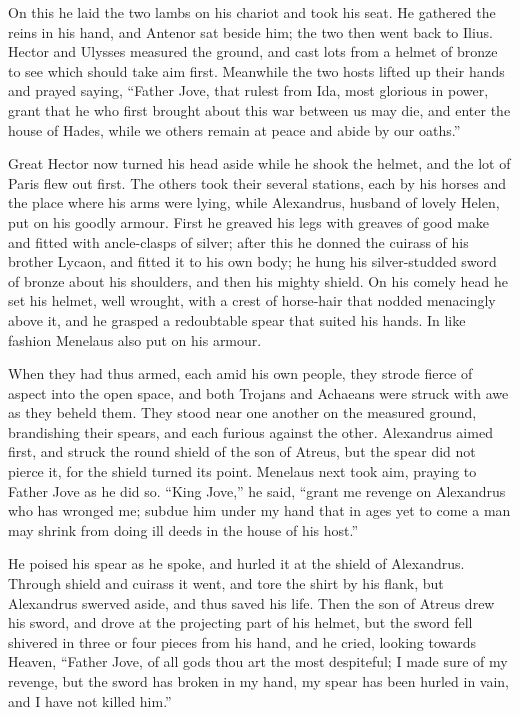 On this he laid the two lambs on his chariot and took his seat. He
gathered the reins in his hand, and Antenor sat beside him; the two then
went back to Ilius. Hector and Ulysses measured the ground, and cast lots
from a helmet of bronze to see which should take aim first. Meanwhile the
two hosts lifted up their hands and prayed saying, “Father Jove, that
rulest from Ida, most glorious in power, grant that he who first brought
about this war between us may die, and enter the house of Hades, while we
others remain at peace and abide by our oaths.”

Great Hector now turned his head aside while he shook the helmet, and the
lot of Paris flew out first. The others took their several stations, each
by his horses and the place where his arms were lying, while Alexandrus,
husband of lovely Helen, put on his goodly armour. First he greaved his
legs with greaves of good make and fitted with ancle-clasps of silver;
after this he donned the cuirass of his brother Lycaon, and fitted it to
his own body; he hung his silver-studded sword of bronze about his
shoulders, and then his mighty shield. On his comely head he set his
helmet, well wrought, with a crest of horse-hair that nodded menacingly
above it, and he grasped a redoubtable spear that suited his hands. In
like fashion Menelaus also put on his armour.

When they had thus armed, each amid his own people, they strode fierce of
aspect into the open space, and both Trojans and Achaeans were struck with
awe as they beheld them. They stood near one another on the measured
ground, brandishing their spears, and each furious against the other.
Alexandrus aimed first, and struck the round shield of the son of Atreus,
but the spear did not pierce it, for the shield turned its point. Menelaus
next took aim, praying to Father Jove as he did so. “King Jove,” he said,
“grant me revenge on Alexandrus who has wronged me; subdue him under my
hand that in ages yet to come a man may shrink from doing ill deeds in the
house of his host.”

He poised his spear as he spoke, and hurled it at the shield of
Alexandrus. Through shield and cuirass it went, and tore the shirt by his
flank, but Alexandrus swerved aside, and thus saved his life. Then the son
of Atreus drew his sword, and drove at the projecting part of his helmet,
but the sword fell shivered in three or four pieces from his hand, and he
cried, looking towards Heaven, “Father Jove, of all gods thou art the most
despiteful; I made sure of my revenge, but the sword has broken in my
hand, my spear has been hurled in vain, and I have not killed him.”

